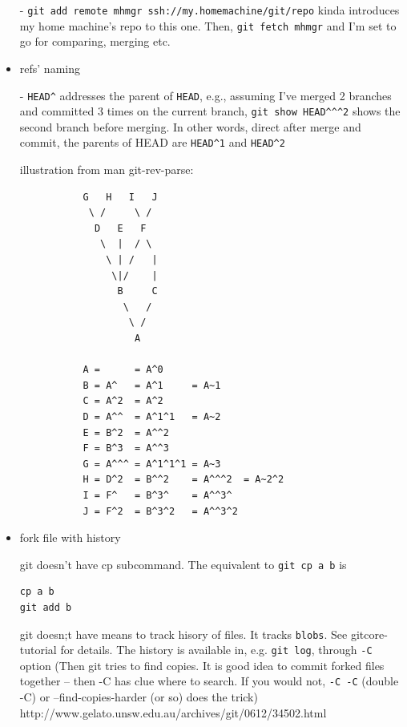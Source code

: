 \begin{itemize}
- \verb`git add remote mhmgr ssh://my.homemachine/git/repo` kinda introduces
  my home machine's repo to this one. Then, \verb`git fetch mhmgr` and I'm
  set to go for comparing, merging etc.

\item{refs' naming}

- \verb`HEAD^` addresses the parent of \verb`HEAD`, e.g., assuming I've
  merged 2 branches and committed 3 times on the current branch, 
  \verb`git show HEAD^^^2` shows the second branch before merging. In
  other words, direct after merge and commit, the parents of HEAD are
  \verb`HEAD^1`  and \verb`HEAD^2`  
   
   illustration from man git-rev-parse:
   
   \begin{code} \begin{verbatim}
           G   H   I   J
            \ /     \ /
             D   E   F
              \  |  / \
               \ | /   |
                \|/    |
                 B     C
                  \   /
                   \ /
                    A

           A =      = A^0
           B = A^   = A^1     = A~1
           C = A^2  = A^2
           D = A^^  = A^1^1   = A~2
           E = B^2  = A^^2
           F = B^3  = A^^3
           G = A^^^ = A^1^1^1 = A~3
           H = D^2  = B^^2    = A^^^2  = A~2^2
           I = F^   = B^3^    = A^^3^
           J = F^2  = B^3^2   = A^^3^2

\end{verbatim} \end{code}

\item{fork file with history}

git doesn't have cp subcommand. The equivalent to \verb+git cp a b+ is 
\begin{code}\begin{verbatim}
cp a b
git add b
\end{verbatim} \end{code}

git doesn;t have means to track hisory of files. It tracks \verb`blobs`.
See gitcore-tutorial for details. The history is available in, e.g.
%
\verb`git log`, through \verb`-C` option (Then git tries to find copies.
It is good idea to commit forked files together -- then -C has clue
where to search. If you would not, \verb`-C -C` (double -C) or
--find-copies-harder (or so) does the trick)
http://www.gelato.unsw.edu.au/archives/git/0612/34502.html

\end{itemize}

